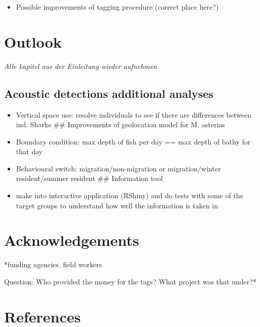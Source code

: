 \documentclass[
  authoryear,
  review,
  3p]{elsarticle}
\providecommand{\tightlist}{%
  \setlength{\itemsep}{0pt}\setlength{\parskip}{0pt}}\usepackage{longtable,booktabs,array}
\begin{document}
\begin{itemize}
\tightlist
\item
  Possible improvements of tagging procedure (correct place here?)
\end{itemize}

\hypertarget{outlook}{%
\section{Outlook}\label{outlook}}

\emph{Alle kapitel aus der Einleitung wieder aufnehmen}

\hypertarget{acoustic-detections-additional-analyses}{%
\subsection{Acoustic detections additional
analyses}\label{acoustic-detections-additional-analyses}}

\begin{itemize}
\tightlist
\item
  Vertical space use: resolve individuals to see if there are
  differences between ind. Sharks \#\# Improvements of geolocation model
  for M. asterias
\item
  Boundary condition: max depth of fish per day == max depth of bathy
  for that day
\item
  Behavioural switch: migration/non-migration or migration/winter
  resident/summer resident \#\# Information tool
\item
  make into interactive application (RShiny) and do tests with some of
  the target groups to understand how well the information is taken in
\end{itemize}

\hypertarget{acknowledgements}{%
\section{Acknowledgements}\label{acknowledgements}}

*funding agencies, field workers

Question: Who provided the money for the tags? What project was that
under?*

\hypertarget{references}{%
\section*{References}\label{references}}
\end{document}
